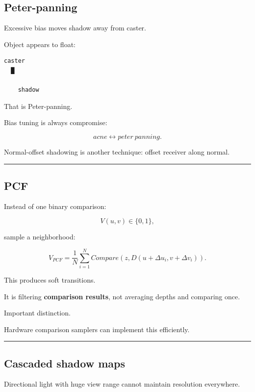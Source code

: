 \subsection{Peter-panning}\label{04-visual-computing-ii-ch040-peter-panning}

Excessive bias moves shadow away from caster.

Object appears to float:

\begin{verbatim}
caster
  █

    shadow
\end{verbatim}

That is Peter-panning.

Bias tuning is always compromise:

\[
acne
\leftrightarrow
peter\ panning.
\]

Normal-offset shadowing is another technique: offset receiver along normal.

\begin{center}\rule{0.5\linewidth}{0.5pt}\end{center}

\subsection{PCF}\label{04-visual-computing-ii-ch040-pcf}

Instead of one binary comparison:

\[
V(u,v)\in\{0,1\},
\]

sample a neighborhood:

\[
\boxed{
V_{PCF}
=
\frac1N
\sum_{i=1}^{N}
Compare(
z,
D(u+\Delta u_i,v+\Delta v_i)
).
}
\]

This produces soft transitions.

It is filtering \textbf{comparison results}, not averaging depths and comparing once.

Important distinction.

Hardware comparison samplers can implement this efficiently.

\begin{center}\rule{0.5\linewidth}{0.5pt}\end{center}

\subsection{Cascaded shadow maps}\label{04-visual-computing-ii-ch040-cascaded-shadow-maps}

Directional light with huge view range cannot maintain resolution everywhere.

